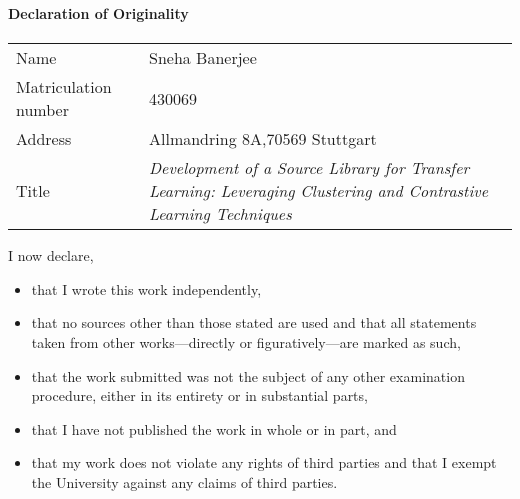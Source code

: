 
\begin{titlepage}

\Large\textbf{Declaration of Originality}
\paragraph{}
\hskip-0.8cm
    \begin{tabular}{p{1.8in}p{4.8in}}
        Name & Sneha Banerjee \\
        Matriculation number & 430069 \\
        Address & Allmandring 8A,70569 Stuttgart \\        
        Title & \textit{Development of a Source Library for Transfer Learning: Leveraging Clustering and Contrastive Learning Techniques} \\
    \end{tabular}

\vspace{1cm}
I now declare,
\begin{itemize}
    \item that I wrote this work independently,
    \item that no sources other than those stated are used and that all statements taken from
other works—directly or figuratively—are marked as such,
    \item that the work submitted was not the subject of any other examination procedure,
either in its entirety or in substantial parts,
    \item that I have not published the work in whole or in part, and
    \item that my work does not violate any rights of third parties and that I exempt the
University against any claims of third parties.
    \end{itemize} 
\end{titlepage}
